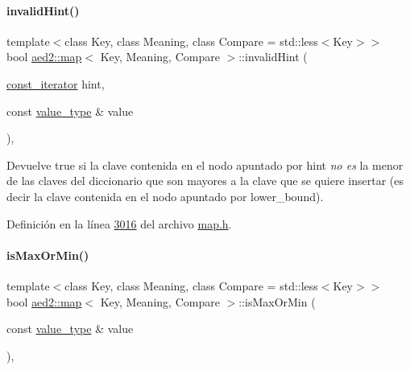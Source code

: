 \mbox{\label{classaed2_1_1map_a7403745a296985d64b8666c18953b2c0_a7403745a296985d64b8666c18953b2c0}} 
\paragraph{\texorpdfstring{invalid\+Hint()}{invalidHint()}}
{\footnotesize\ttfamily template$<$class Key, class Meaning, class Compare = std\+::less$<$\+Key$>$$>$ \\
bool \hyperlink{classaed2_1_1map}{aed2\+::map}$<$ Key, Meaning, Compare $>$\+::invalid\+Hint (\begin{DoxyParamCaption}\item[{\hyperlink{classaed2_1_1map_1_1const__iterator}{const\+\_\+iterator}}]{hint,  }\item[{const \hyperlink{classaed2_1_1map_a719db98e0ff9a837610f76be33264680_a719db98e0ff9a837610f76be33264680}{value\+\_\+type} \&}]{value }\end{DoxyParamCaption})\hspace{0.3cm}{\ttfamily [inline]}, {\ttfamily [private]}}



Devuelve true si la clave contenida en el nodo apuntado por hint {\itshape  no es } la menor de las claves del diccionario que son mayores a la clave que se quiere insertar (es decir la clave contenida en el nodo apuntado por lower\+\_\+bound). 



Definición en la línea \hyperlink{map_8h_source_l03016}{3016} del archivo \hyperlink{map_8h_source}{map.\+h}.

\mbox{\label{classaed2_1_1map_a81db4ead6daafe94938d5410173bdb6c_a81db4ead6daafe94938d5410173bdb6c}} 
\paragraph{\texorpdfstring{is\+Max\+Or\+Min()}{isMaxOrMin()}}
{\footnotesize\ttfamily template$<$class Key, class Meaning, class Compare = std\+::less$<$\+Key$>$$>$ \\
bool \hyperlink{classaed2_1_1map}{aed2\+::map}$<$ Key, Meaning, Compare $>$\+::is\+Max\+Or\+Min (\begin{DoxyParamCaption}\item[{const \hyperlink{classaed2_1_1map_a719db98e0ff9a837610f76be33264680_a719db98e0ff9a837610f76be33264680}{value\+\_\+type} \&}]{value }\end{DoxyParamCaption})\hspace{0.3cm}{\ttfamily [inline]}, {\ttfamily [private]}}



